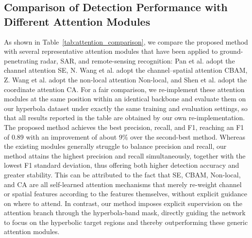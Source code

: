 \documentclass[lettersize,journal]{IEEEtran}
\begin{document}
\subsection{Comparison of Detection Performance with Different Attention Modules}
As shown in Table~\ref{tab:attention_comparison}, 
we compare the proposed method with several representative attention modules 
that have been applied to ground-penetrating radar, SAR, and remote-sensing recognition: 
Pan et al. adopt the channel attention SE, 
N. Wang et al. adopt the channel–spatial attention CBAM, 
Z. Wang et al. adopt the non-local attention Non-local, 
and Shen et al. adopt the coordinate attention CA. 
For a fair comparison, we re-implement these attention modules at the same position 
within an identical backbone and evaluate them on our hyperbola dataset 
under exactly the same training and evaluation settings, 
so that all results reported in the table are obtained by our own re-implementation. 
The proposed method achieves the best precision, recall, and F1, 
reaching an F1 of 0.89 with an improvement of about 9\% over the second-best method. 
Whereas the existing modules generally struggle to balance precision and recall, 
our method attains the highest precision and recall simultaneously, 
together with the lowest F1 standard deviation, 
thus offering both higher detection accuracy and greater stability. 
This can be attributed to the fact that SE, CBAM, Non-local, and CA are 
all self-learned attention mechanisms that merely re-weight channel or spatial features according 
to the features themselves, without explicit guidance on where to attend. 
In contrast, our method imposes explicit supervision on the attention branch 
through the hyperbola-band mask, directly guiding the network to 
focus on the hyperbolic target regions and thereby outperforming these generic attention modules.
\end{document}
